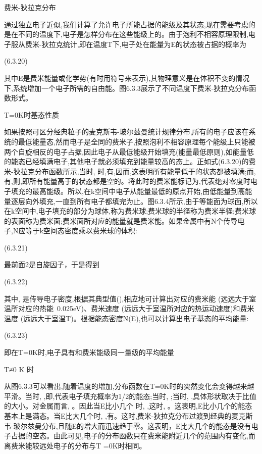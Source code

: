 费米-狄拉克分布

通过独立电子近似,我们计算了允许电子所能占据的能级及其状态,现在需要考虑的是在不同的温度下,电子是怎样分布在这些能级上的。由于泡利不相容原理限制,电子服从费米-狄拉克统计,即在温度T下,电子处在能量为E的状态被占据的概率为

 	(6.3.20)

其中E是费米能量或化学势(有时用符号来表示),其物理意义是在体积不变的情况下,系统增加一个电子所需的自由能。图6.3.3展示了不同温度下费米-狄拉克分布函数形式。





T=0K时基态性质

如果按照可区分经典粒子的麦克斯韦-玻尔兹曼统计规律分布,所有的电子应该在系统的最低能量态,然而电子是全同的费米子,按照泡利不相容原理每个能级上只能被两个自旋相反的电子占据,因此电子从最低能级开始填充(能量最低原则),如能量低的能态已经填满电子,其他电子就必须填充到能量较高的态上。正如式(6.3.20)的费米-狄拉克分布函数所示,当时, 时,有,因而,这表明所有能量低于的状态都被填满;而,有,则,即所有能量高于的状态都是空的。将此时的费米能标记为,代表绝对零度时电子填充的最高能级。所以,在k空间中电子从能量最低的原点开始,由低能量到高能量逐层向外填充,一直到所有电子都填完为止。图6.3.4所示,由于等能面为球面,所以在k空间中,电子填充的部分为球体,称为费米球;费米球的半径称为费米半径;费米球的表面称为费米面;费米面所对应的能量就是费米能。如果金属中有N个传导电子,N应等于k空间态密度乘以费米球的体积:

 	(6.3.21)

最前面2是自旋因子，于是得到

 	(6.3.22)

其中, 是传导电子密度,根据其典型值(),相应地可计算出对应的费米能 (远远大于室温所对应的热能~0.025eV)、费米速度 (远远大于室温所对应的热运动速度)和费米温度 (远远大于室温T)。根据能态密度N(E),也可以计算出电子基态的平均能量:

 (6.3.23)

即在T=0K时,电子具有和费米能级同一量级的平均能量

T≠0 K 时

从图6.3.3可以看出,随着温度的增加,分布函数在T=0K时的突然变化会变得越来越平滑。当时, ,即,代表电子填充概率为1/2的能态;当时, ;当时, ,具体形状取决于比值的大小。对金属而言, 。因此当E比小几个 时, ,这时, 。这表明,E比小几个的能态基本上是满态。当E比大几个时, ,有。这时,费米-狄拉克分布过渡到经典的麦克斯韦-玻尔兹曼分布,且随E的增大而迅速趋于零。这表明，E比大几个的能态是没有电子占据的空态。由此可见,电子的分布函数只在费米能附近几个的范围内有变化,而离费米能较远处电子的分布与T =0K时相同。

